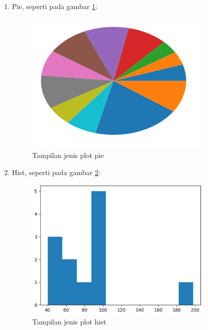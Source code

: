 \begin{enumerate}
\item Pie, seperti pada gambar \ref{fig:pltpie}:
\begin{figure}[!htbp]
	\centerline{\includegraphics[width=0.85\textwidth]{figures/6/pltpie.PNG}}
	\caption{Tampilan jenis plot pie}
	\label{fig:pltpie}
\end{figure}

\item Hist, seperti pada gambar \ref{fig:hist}:
\begin{figure}[!htbp]
	\centerline{\includegraphics[width=0.85\textwidth]{figures/6/hist.PNG}}
	\caption{Tampilan jenis plot hist}
	\label{fig:hist}
\end{figure}


\end{enumerate}

